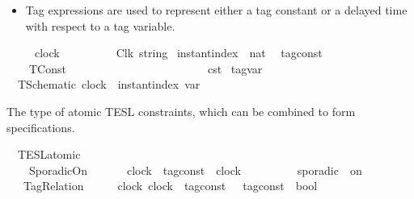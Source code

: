 \begin{isabellebody}
\begin{isamarkuptext}
\begin{itemize}
\item Tag expressions are used to represent either a tag constant or a delayed time with respect 
to a tag variable.%
\end{itemize}%
\end{isamarkuptext}\isamarkuptrue%
\isamarkupfalse%
\ \ \ \ \ clock\ \ \ \ \ \ \ \ \ {\isacharequal}\ Clk\ {\isacartoucheopen}string{\isacartoucheclose}\isanewline
{}\isamarkupfalse%
\ instant{\isacharunderscore}index\ {\isacharequal}\ {\isacartoucheopen}nat{\isacartoucheclose}\isanewline
\isanewline
{}\isamarkupfalse%
\ {\isacharprime}{\isasymtau}\ tag{\isacharunderscore}const\ {\isacharequal}\isanewline
\ \ \ \ TConst\ \ \ {\isacharprime}{\isasymtau}\ \ \ \ \ \ \ \ \ \ \ \ \ \ \ \ \ \ \ \ \ \ {\isacharparenleft}{\isachardoublequoteopen}{\isasymtau}\isactrlsub c\isactrlsub s\isactrlsub t{\isachardoublequoteclose}{\isacharparenright}\isanewline
\isanewline
{}\isamarkupfalse%
\ tag{\isacharunderscore}var\ {\isacharequal}\isanewline
\ \ TSchematic\ {\isacartoucheopen}clock\ {\isacharasterisk}\ instant{\isacharunderscore}index{\isacartoucheclose}\ {\isacharparenleft}{\isachardoublequoteopen}{\isasymtau}\isactrlsub v\isactrlsub a\isactrlsub r{\isachardoublequoteclose}{\isacharparenright}%
\isadelimdocument
%
\endisadelimdocument
%
\isatagdocument
%
\isamarkuptrue%
%
\endisatagdocument
{\isafolddocument}%
%
\isadelimdocument
%
\endisadelimdocument
%
\begin{isamarkuptext}%
The type of atomic TESL constraints, which can be combined to form specifications.%
\end{isamarkuptext}\isamarkuptrue%
\isamarkupfalse%
\ {\isacharprime}{\isasymtau}\ TESL{\isacharunderscore}atomic\ {\isacharequal}\isanewline
\ \ \ \ SporadicOn\ \ \ \ \ \ \ {\isacartoucheopen}clock{\isacartoucheclose}\ {\isacartoucheopen}{\isacharprime}{\isasymtau}\ tag{\isacharunderscore}const{\isacartoucheclose}\ \ {\isacartoucheopen}clock{\isacartoucheclose}\ \ \ \ \ \ \ \ \ {\isacharparenleft}{\isachardoublequoteopen}{\isacharunderscore}\ sporadic\ {\isacharunderscore}\ on\ {\isacharunderscore}{\isachardoublequoteclose}\ {}{}{\isacharparenright}\isanewline
\ \ {\isacharbar}\ TagRelation\ \ \ \ \ \ {\isacartoucheopen}clock{\isacartoucheclose}\ {\isacartoucheopen}clock{\isacartoucheclose}\ {\isacartoucheopen}{\isacharparenleft}{\isacharprime}{\isasymtau}\ tag{\isacharunderscore}const\ {\isasymtimes}\ {\isacharprime}{\isasymtau}\ tag{\isacharunderscore}const{\isacharparenright}\ {\isasymRightarrow}\ bool{\isacartoucheclose}\ \isanewline

\end{isabellebody}
